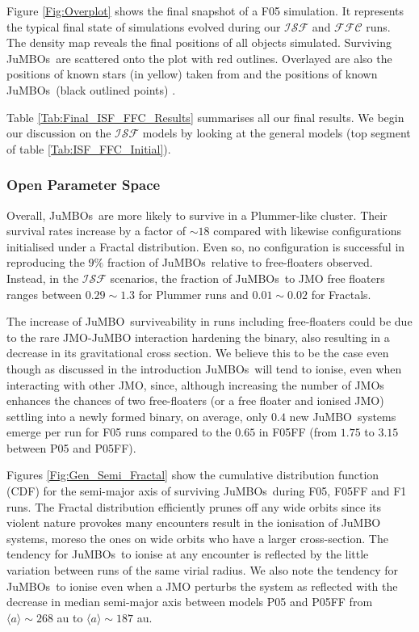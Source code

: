 \documentclass[aa]{lib/aa}
\newcommand{\jumbo}{\mbox{JuMBO}}
\newcommand{\jumbos}{\mbox{JuMBOs}}
\begin{document}
    Figure \ref{Fig:Overplot} shows the final snapshot of a F05 simulation. It represents the typical final state of simulations evolved during our $\mathcal{ISF}$ and $\mathcal{FFC}$ runs. The density map reveals the final positions of all objects simulated. Surviving \jumbos\, are scattered onto the plot with red outlines. Overlayed are also the positions of known stars (in yellow) taken from \citet{2016A&A...595A...1G, 2023A&A...674A...1G} and the positions of known \jumbos\, (black outlined points) \citep{2023arXiv231001231P}.

    Table \ref{Tab:Final_ISF_FFC_Results} summarises all our final results. We begin our discussion on the $\mathcal{ISF}$ models by looking at the general models (top segment of table \ref{Tab:ISF_FFC_Initial}). 
     
    \subsubsection{Open Parameter Space}
    Overall, \jumbos\, are more likely to survive in a Plummer-like cluster. Their survival rates increase by a factor of $\sim 18$ compared with likewise configurations initialised under a Fractal distribution. Even so, no configuration is successful in reproducing the $9\%$ fraction of \jumbos\, relative to free-floaters observed. Instead, in the $\mathcal{ISF}$ scenarios, the fraction of \jumbos\, to JMO free floaters ranges between $0.29\sim1.3$ for Plummer runs and $0.01\sim0.02$ for Fractals.
    
    The increase of \jumbo\, surviveability in runs including free-floaters could be due to the rare JMO-JuMBO interaction hardening the binary, also resulting in a decrease in its gravitational cross section. We believe this to be the case even though as discussed in the introduction \jumbos\, will tend to ionise, even when interacting with other JMO, since, although increasing the number of JMOs enhances the chances of two free-floaters (or a free floater and ionised JMO) settling into a newly formed binary, on average, only $0.4$ new \jumbo\, systems emerge per run for F05 runs compared to the $0.65$ in F05FF (from $1.75$ to $3.15$ between P05 and P05FF). 
    
    Figures \ref{Fig:Gen_Semi_Fractal} show the cumulative distribution function (CDF) for the semi-major axis of surviving \jumbos\, during F05, F05FF and F1 runs. The Fractal distribution efficiently prunes off any wide orbits since its violent nature provokes many encounters result in the ionisation of \jumbo\, systems, moreso the ones on wide orbits who have a larger cross-section. The tendency for \jumbos\, to ionise at any encounter is reflected by the little variation between runs of the same virial radius. We also note the tendency for \jumbos\, to ionise even when a JMO perturbs the system as reflected with the decrease in median semi-major axis between models P05 and P05FF from $\langle a\rangle\sim268$ au to $\langle a\rangle\sim187$ au.
   
\end{document}
